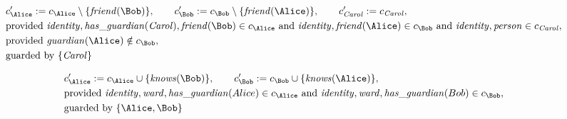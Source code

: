 \begin{align*}
&
c'_
{
\Alice
}
 := 
c_
{
\Alice
}
 \setminus 
\{
\mathit{\detokenize{
friend
}}
(
\Bob
)
\}
, \qquad 
c'_
{
\Bob
}
 := 
c_
{
\Bob
}
 \setminus 
\{
\mathit{\detokenize{
friend
}}
(
\Alice
)
\}
, \qquad 
c'_
{
\mathit{Carol}
}
 := 
c_
{
\mathit{Carol}
}
,\\
&
\text{provided } 
\mathit{\detokenize{
identity
}}
,
\mathit{\detokenize{
has_guardian
}}
(
\mathit{Carol}
)
,
\mathit{\detokenize{
friend
}}
(
\Bob
)
 \in c_
{
\Alice
}
 \text{ and } 
\mathit{\detokenize{
identity
}}
,
\mathit{\detokenize{
friend
}}
(
\Alice
)
 \in c_
{
\Bob
}
 \text{ and } 
\mathit{\detokenize{
identity
}}
,
\mathit{\detokenize{
person
}}
 \in c_
{
\mathit{Carol}
}
,\\
&
\text{provided } 
\mathit{\detokenize{
guardian
}}
(
\Alice
)
 \notin c_
{
\Bob
}
,\\
&
\text{guarded by } \{
\mathit{Carol}
\}
\end{align*}

\begin{align*}
&
c'_
{
\Alice
}
 := 
c_
{
\Alice
}
 \cup 
\{
\mathit{\detokenize{
knows
}}
(
\Bob
)
\}
, \qquad 
c'_
{
\Bob
}
 := 
c_
{
\Bob
}
 \cup 
\{
\mathit{\detokenize{
knows
}}
(
\Alice
)
\}
,\\
&
\text{provided } 
\mathit{\detokenize{
identity
}}
,
\mathit{\detokenize{
ward
}}
,
\mathit{\detokenize{
has_guardian
}}
(
Alice
)
 \in c_
{
\Alice
}
 \text{ and } 
\mathit{\detokenize{
identity
}}
,
\mathit{\detokenize{
ward
}}
,
\mathit{\detokenize{
has_guardian
}}
(
Bob
)
 \in c_
{
\Bob
}
,\\
&
\text{guarded by } \{
\Alice
,
\Bob
\}
\end{align*}

